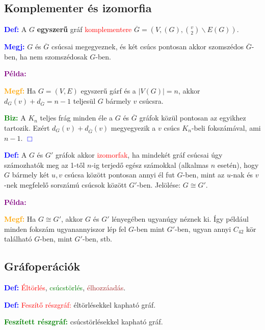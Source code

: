 \documentclass[../szamtud.tex]{subfiles}
\begin{document}
    \subsection{Komplementer és izomorfia}

        \textcolor{blue}{\textbf{Def:}}	A $G$ \textbf{egyszerű} gráf \textcolor{red}{komplementere} $\overline{G} = (V,(G), \binom{v}{2} \backslash E(G))$.

        \textcolor{blue}{\textbf{Megj:}} $G$ és $\overline{G}$ csúcsai megegyeznek, és két csúcs pontosan akkor szomszédos $\overline{G}$-ben, ha nem szomszédosak $G$-ben.

        \textcolor{purple}{\textbf{Példa:}}

        \textcolor{orange}{\textbf{Megf:}} Ha $G = (V,E)$ egyszerű gárf és a $|V(G)| = n$, akkor $d_G(v)+d_{\overline{G}}=n-1$ teljesül $G$ bármely $v$ csúcsra.

        \textcolor{green}{\textbf{Biz:}} A $K_n$ teljes frág minden éle a $G$ és $\overline{G}$ gráfok közül pontosan az egyikhez tartozik. Ezért $d_G (v) + d_{\overline{G}}(v)$ megyegyezik a $v$ csúcs $K_n$-beli fokszámával, ami $n-1$. \textcolor{blue}{$\Box$}

        \textcolor{blue}{\textbf{Def:}} A $G$ és $G'$ gráfok akkor \textcolor{red}{izomorfak}, ha mindekét gráf csúcsai úgy számozhatók meg az 1-től $n$-ig terjedő egész számokkal (alkalmas $n$ esetén), hogy $G$ bármely két $u,v$ csúcsa között pontosan annyi él fut $G$-ben, mint az $u$-nak és $v$-nek megfelelő sorszámú csúcsok között $G'$-ben. Jelölése: $G \cong G'$.

        \textcolor{purple}{\textbf{Példa:}}

        \textcolor{orange}{\textbf{Megf:}} Ha $G \cong G'$, akkor $G$ és $G'$ lényegében ugyanúgy néznek ki. Így például minden fokszám ugyanannyiszor lép fel $G$-ben mint $G'$-ben, ugyan annyi $C_{42}$ kör található $G$-ben, mint $G'$-ben, stb.

    \subsection{Gráfoperációk}

        \textcolor{blue}{\textbf{Def:}} \textcolor{red}{Éltörlés}, \textcolor{green}{csúcstörlés}, \textcolor{brown}{élhozzáadás}.

        \textcolor{blue}{\textbf{Def:}} \textcolor{red}{Feszítő részgráf:} éltörlésekkel kapható gráf.

        \textcolor{green}{\textbf{Feszített részgráf:}} csúcstörlésekkel kapható gráf.
\end{document}

